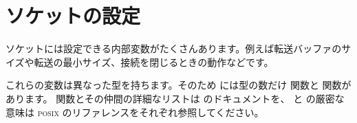 \section {ソケットの設定}

ソケットには設定できる内部変数がたくさんあります。例えば転送バッファのサイズや転送の最小サイズ、接続を閉じるときの動作などです。

これらの変数は異なった型を持ちます。そのため \ocaml には型の数だけ 関数と  関数があります。 関数とその仲間の詳細なリストは \ocaml のドキュメントを、 と  の厳密な意味は \textsc{posix} のリファレンスをそれぞれ参照してください。

